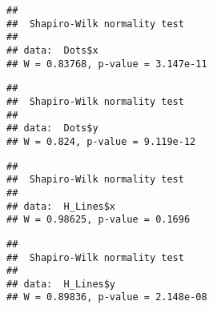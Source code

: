 \documentclass[
]{article}
\newenvironment{Shaded}{\begin{snugshade}}{\end{snugshade}}
\newcommand{\FunctionTok}[1]{\textcolor[rgb]{0.13,0.29,0.53}{\textbf{#1}}}
\newcommand{\NormalTok}[1]{#1}
\newcommand{\OtherTok}[1]{\textcolor[rgb]{0.56,0.35,0.01}{#1}}
\newcommand{\SpecialCharTok}[1]{\textcolor[rgb]{0.81,0.36,0.00}{\textbf{#1}}}
\newcommand{\StringTok}[1]{\textcolor[rgb]{0.31,0.60,0.02}{#1}}
\begin{document}
\begin{verbatim}
## 
##  Shapiro-Wilk normality test
## 
## data:  Dots$x
## W = 0.83768, p-value = 3.147e-11
\end{verbatim}

\begin{Shaded}
\end{Shaded}

\begin{verbatim}
## 
##  Shapiro-Wilk normality test
## 
## data:  Dots$y
## W = 0.824, p-value = 9.119e-12
\end{verbatim}

\begin{Shaded}
\end{Shaded}

\begin{verbatim}
## 
##  Shapiro-Wilk normality test
## 
## data:  H_Lines$x
## W = 0.98625, p-value = 0.1696
\end{verbatim}

\begin{Shaded}
\end{Shaded}

\begin{verbatim}
## 
##  Shapiro-Wilk normality test
## 
## data:  H_Lines$y
## W = 0.89836, p-value = 2.148e-08
\end{verbatim}

\begin{Shaded}
\end{Shaded}
\end{document}
